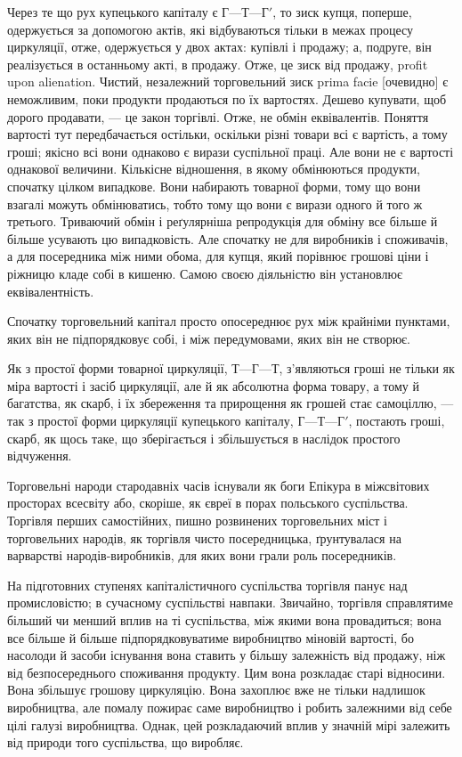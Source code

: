 
Через те що рух купецького капіталу є $Г — Т — Г'$, то зиск
купця, поперше, одержується за допомогою актів, які відбуваються
тільки в межах процесу циркуляції, отже, одержується
у двох актах: купівлі і продажу; а, подруге, він реалізується в
останньому акті, в продажу. Отже, це зиск від продажу, profit
upon alienation. Чистий, незалежний торговельний зиск prima
facie [очевидно] є неможливим, поки продукти продаються по їх
вартостях. Дешево купувати, щоб дорого продавати, — це закон
торгівлі. Отже, не обмін еквівалентів. Поняття вартості тут
передбачається остільки, оскільки різні товари всі є вартість,
а тому гроші; якісно всі вони однаково є вирази суспільної праці.
Але вони не є вартості однакової величини. Кількісне відношення,
в якому обмінюються продукти, спочатку цілком випадкове. Вони
набирають товарної форми, тому що вони взагалі можуть обмінюватись,
тобто тому що вони є вирази одного й того ж третього.
Триваючий обмін і реґулярніша репродукція для обміну все більше
й більше усувають цю випадковість. Але спочатку не для виробників
і споживачів, а для посередника між ними обома, для
купця, який порівнює грошові ціни і ріжницю кладе собі в кишеню.
Самою своєю діяльністю він установлює еквівалентність.

Спочатку торговельний капітал просто опосереднює рух між
крайніми пунктами, яких він не підпорядковує собі, і між передумовами,
яких він не створює.

Як з простої форми товарної циркуляції, $Т — Г — Т$, з’являються
гроші не тільки як міра вартості і засіб циркуляції, але й як
абсолютна форма товару, а тому й багатства, як скарб, і їх збереження
та прирощення як грошей стає самоціллю, — так з простої
форми циркуляції купецького капіталу, $Г — Т — Г'$, постають
гроші, скарб, як щось таке, що зберігається і збільшується в наслідок
простого відчуження.

Торговельні народи стародавніх часів існували як боги Епікура
в міжсвітових просторах всесвіту або, скоріше, як євреї в
порах польського суспільства. Торгівля перших самостійних,
пишно розвинених торговельних міст і торговельних народів, як
торгівля чисто посередницька, ґрунтувалася на варварстві народів-виробників,
для яких вони грали роль посередників.

На підготовних ступенях капіталістичного суспільства торгівля
панує над промисловістю; в сучасному суспільстві навпаки. Звичайно,
торгівля справлятиме більший чи менший вплив на ті суспільства,
між якими вона провадиться; вона все більше й більше
підпорядковуватиме виробництво міновій вартості, бо насолоди
й засоби існування вона ставить у більшу залежність від продажу,
ніж від безпосереднього споживання продукту. Цим вона розкладає
старі відносини. Вона збільшує грошову циркуляцію. Вона захоплює
вже не тільки надлишок виробництва, але помалу пожирає
саме виробництво і робить залежними від себе цілі галузі
виробництва. Однак, цей розкладаючий вплив у значній мірі
залежить від природи того суспільства, що виробляє.

